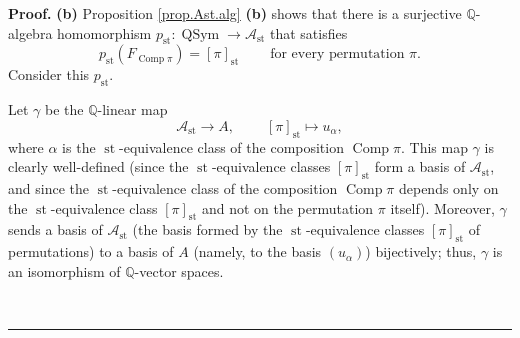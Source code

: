 \documentclass[numbers=enddot,12pt,final,onecolumn,notitlepage]{scrartcl}%
\theoremstyle{definition}
\newenvironment{proof}[1][Proof]{\noindent\textbf{#1.} }{\ \rule{0.5em}{0.5em}}
\begin{document}
\begin{proof}
\textbf{(b)} Proposition \ref{prop.Ast.alg} \textbf{(b)} shows that there is a
surjective $\mathbb{Q}$-algebra homomorphism $p_{\operatorname*{st}%
}:\operatorname*{QSym}\rightarrow\mathcal{A}_{\operatorname*{st}}$ that
satisfies
\begin{equation}
p_{\operatorname*{st}}\left(  F_{\operatorname*{Comp}\pi}\right)  =\left[
\pi\right]  _{\operatorname*{st}}\ \ \ \ \ \ \ \ \ \ \text{for every
permutation }\pi. \label{pf.thm.4.3.b.pst}%
\end{equation}
Consider this $p_{\operatorname*{st}}$.

Let $\gamma$ be the $\mathbb{Q}$-linear map%
\[
\mathcal{A}_{\operatorname*{st}}\rightarrow A,\ \ \ \ \ \ \ \ \ \ \left[
\pi\right]  _{\operatorname*{st}}\mapsto u_{\alpha},
\]
where $\alpha$ is the $\operatorname*{st}$-equivalence class of the
composition $\operatorname*{Comp}\pi$. This map $\gamma$ is clearly
well-defined (since the $\operatorname*{st}$-equivalence classes $\left[
\pi\right]  _{\operatorname*{st}}$ form a basis of $\mathcal{A}%
_{\operatorname*{st}}$, and since the $\operatorname*{st}$-equivalence class
of the composition $\operatorname*{Comp}\pi$ depends only on the
$\operatorname*{st}$-equivalence class $\left[  \pi\right]
_{\operatorname*{st}}$ and not on the permutation $\pi$ itself). Moreover,
$\gamma$ sends a basis of $\mathcal{A}_{\operatorname*{st}}$ (the basis formed
by the $\operatorname*{st}$-equivalence classes $\left[  \pi\right]
_{\operatorname*{st}}$ of permutations) to a basis of $A$ (namely, to the
basis $\left(  u_{\alpha}\right)  $) bijectively; thus, $\gamma$ is an
isomorphism of $\mathbb{Q}$-vector spaces.


\end{proof}
\end{document}
